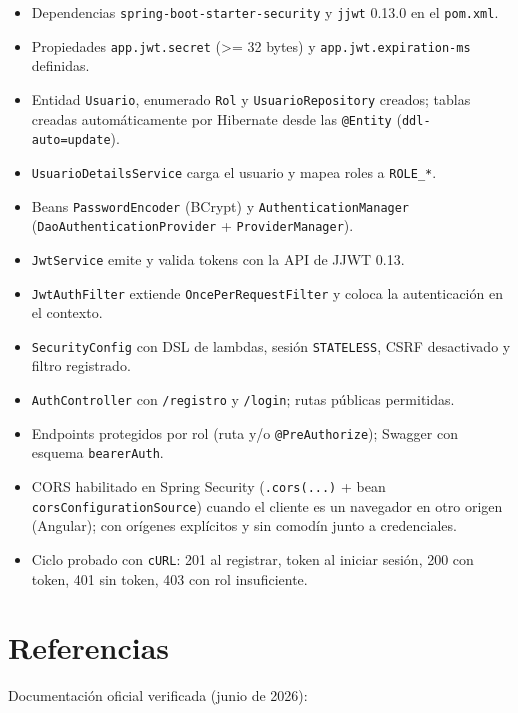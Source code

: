 \documentclass[11pt]{article}
\begin{document}
\begin{itemize}[leftmargin=1.4em,itemsep=2pt,topsep=2pt]
\item Dependencias \texttt{spring-boot-starter-security} y \texttt{jjwt} 0.13.0 en el \texttt{pom.xml}.
\item Propiedades \texttt{app.jwt.secret} (>= 32 bytes) y \texttt{app.jwt.expiration-ms} definidas.
\item Entidad \texttt{Usuario}, enumerado \texttt{Rol} y \texttt{UsuarioRepository} creados; tablas creadas automáticamente por Hibernate desde las \texttt{@Entity} (\texttt{ddl-auto=update}).
\item \texttt{UsuarioDetailsService} carga el usuario y mapea roles a \texttt{ROLE\_*}.
\item Beans \texttt{PasswordEncoder} (BCrypt) y \texttt{AuthenticationManager} (\texttt{DaoAuthenticationProvider} + \texttt{ProviderManager}).
\item \texttt{JwtService} emite y valida tokens con la API de JJWT 0.13.
\item \texttt{JwtAuthFilter} extiende \texttt{OncePerRequestFilter} y coloca la autenticación en el contexto.
\item \texttt{SecurityConfig} con DSL de lambdas, sesión \texttt{STATELESS}, CSRF desactivado y filtro registrado.
\item \texttt{AuthController} con \texttt{/registro} y \texttt{/login}; rutas públicas permitidas.
\item Endpoints protegidos por rol (ruta y/o \texttt{@PreAuthorize}); Swagger con esquema \texttt{bearerAuth}.
\item CORS habilitado en Spring Security (\texttt{.cors(...)} + bean \texttt{corsConfigurationSource}) cuando el cliente es un navegador en otro origen (Angular); con orígenes explícitos y sin comodín junto a credenciales.
\item Ciclo probado con \texttt{cURL}: 201 al registrar, token al iniciar sesión, 200 con token, 401 sin token, 403 con rol insuficiente.
\end{itemize}

\section{Referencias}
Documentación oficial verificada (junio de 2026):
\end{document}

